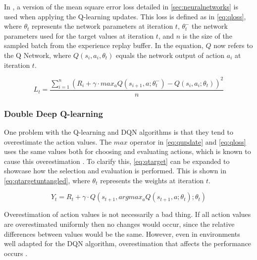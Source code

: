 \documentclass{kththesis}
\begin{document}
In \parencite{mnih2015human}, a version of the mean square error loss detailed in \autoref{sec:neuralnetworks} is used when applying the Q-learning updates. This loss is defined as in \autoref{eq:qloss}, where $\theta_t$ represents the network parameters at iteration $t$, $\theta_t^-$ the network parameters used for the target values at iteration $t$, and $n$ is the size of the sampled batch from the experience replay buffer. In the equation, $Q$ now refers to the Q Network, where $Q(s_i, a_i, \theta_t)$ equals the network output of action $a_i$ at iteration $t$.

\begin{equation}
\label{eq:qloss}
L_t = \frac{\sum_{i=1}^n (R_i + \gamma \cdot max_a Q(s_{i+1}, a;\theta_t^-) - Q(s_i, a_i;\theta_t))^2}{n}
\end{equation}

\subsubsection{Double Deep Q-learning}
One problem with the Q-learning and DQN algorithms is that they tend to overestimate the action values. The $max$ operator in \autoref{eq:qupdate} and \autoref{eq:qloss} uses the same values both for choosing and evaluating actions, which is known to cause this overestimation \parencite{van2016deep}. To clarify this, \autoref{eq:qtarget} can be expanded to showcase how the selection and evaluation is performed. This is shown in \autoref{eq:qtargetuntangled}, where $\theta_t$ represents the weights at iteration $t$.

\begin{equation}
\label{eq:qtargetuntangled}
Y_t = R_t + \gamma \cdot Q(s_{t+1}, argmax_aQ(s_{t+1}, a;\theta_t);\theta_t)
\end{equation}

Overestimation of action values is not necessarily a bad thing. If all action values are overestimated uniformly then no changes would occur, since the relative differences between values would be the same. However, even in environments well adapted for the DQN algorithm, overestimation that affects the performance occurs \parencite{van2016deep}.
\end{document}
